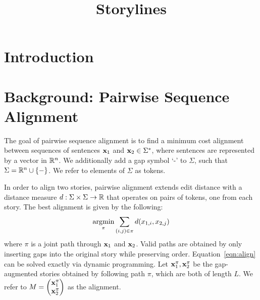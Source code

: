 \documentclass{article}
\title{Storylines}
\begin{document}
\maketitle

\section{Introduction}

\section{Background: Pairwise Sequence Alignment}
The goal of pairwise sequence alignment is to find a minimum cost alignment
between sequences of sentences $\mathbf{x}_1$ and $\mathbf{x}_2\in\Sigma^*$, where
sentences are represented by a vector in $\mathbb{R}^n$.
We additionally add a gap symbol `-' to $\Sigma$, such that 
$\Sigma = \mathbb{R}^n \cup \left\{-\right\}$.
We refer to elements of $\Sigma$ as tokens.

In order to align two stories, pairwise alignment extends edit distance
with a distance measure $d: \Sigma\times\Sigma\to\mathbb{R}$ that operates on pairs of tokens,
one from each story.
The best alignment is given by the following:
\begin{equation}
\label{eqn:align}
\operatorname*{argmin}_\pi \sum_{(i, j) \in \pi} d(x_{1,i},x_{2,j})
\end{equation}
where $\pi$ is a joint path through $\mathbf{x}_1$ and $\mathbf{x}_2$.
Valid paths are obtained by only inserting gaps into the original story
while preserving order.
Equation~\ref{eqn:align} can be solved exactly via dynamic programming.
Let $\mathbf{x}^\pi_1,\mathbf{x}^\pi_2$ be the gap-augmented stories obtained by following path $\pi$,
which are both of length $L$.
We refer to 
$M = \begin{pmatrix}\mathbf{x}^\pi_1 \\ \mathbf{x}^\pi_2 \end{pmatrix}$
as the alignment.
\end{document}

